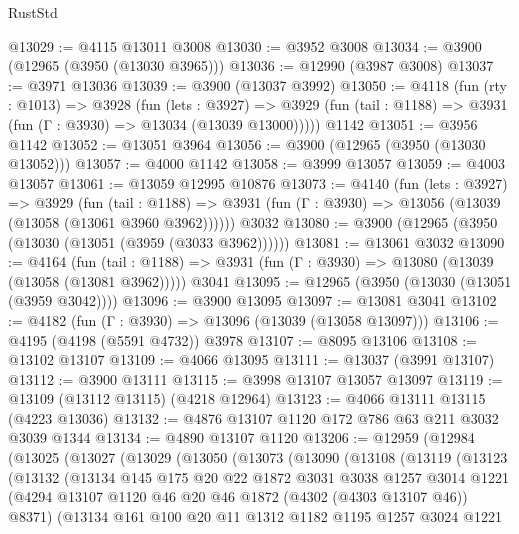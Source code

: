 \begin{lexlean}{RustStd}
\begin{coremodule}
@13029 := @4115 @13011 @3008
@13030 := @3952 @3008
@13034 := @3900 (@12965 (@3950 (@13030 @3965)))
@13036 := @12990 (@3987 @3008)
@13037 := @3971 @13036
@13039 := @3900 (@13037 @3992)
@13050 := @4118
    (fun (rty : @1013) =>
    @3928
      (fun (lets : @3927) =>
      @3929 (fun (tail : @1188) => @3931 (fun (Γ : @3930) => @13034 (@13039 @13000)))))
    @1142
@13051 := @3956 @1142
@13052 := @13051 @3964
@13056 := @3900 (@12965 (@3950 (@13030 @13052)))
@13057 := @4000 @1142
@13058 := @3999 @13057
@13059 := @4003 @13057
@13061 := @13059 @12995 @10876
@13073 := @4140
    (fun (lets : @3927) =>
    @3929
      (fun (tail : @1188) =>
      @3931 (fun (Γ : @3930) => @13056 (@13039 (@13058 (@13061 @3960 @3962))))))
    @3032
@13080 := @3900 (@12965 (@3950 (@13030 (@13051 (@3959 (@3033 @3962))))))
@13081 := @13061 @3032
@13090 := @4164
    (fun (tail : @1188) => @3931 (fun (Γ : @3930) => @13080 (@13039 (@13058 (@13081 @3962)))))
    @3041
@13095 := @12965 (@3950 (@13030 (@13051 (@3959 @3042))))
@13096 := @3900 @13095
@13097 := @13081 @3041
@13102 := @4182 (fun (Γ : @3930) => @13096 (@13039 (@13058 @13097)))
@13106 := @4195 (@4198 (@5591 @4732)) @3978
@13107 := @8095 @13106
@13108 := @13102 @13107
@13109 := @4066 @13095
@13111 := @13037 (@3991 @13107)
@13112 := @3900 @13111
@13115 := @3998 @13107 @13057 @13097
@13119 := @13109 (@13112 @13115) (@4218 @12964)
@13123 := @4066 @13111 @13115 (@4223 @13036)
@13132 := @4876 @13107 @1120 @172 @786 @63 @211 @3032 @3039 @1344
@13134 := @4890 @13107 @1120
@13206 := @12959
    (@12984
      (@13025
        (@13027
          (@13029
            (@13050
              (@13073
                (@13090
                  (@13108
                    (@13119
                      (@13123
                        (@13132
                          (@13134
                            @145
                            @175
                            @20
                            @22
                            @1872
                            @3031
                            @3038
                            @1257
                            @3014
                            @1221
                            (@4294 @13107 @1120 @46 @20 @46 @1872 (@4302 (@4303 @13107 @46)) @8371)
                            (@13134
                              @161
                              @100
                              @20
                              @11
                              @1312
                              @1182
                              @1195
                              @1257
                              @3024
                              @1221

\end{coremodule}
\end{lexlean}
